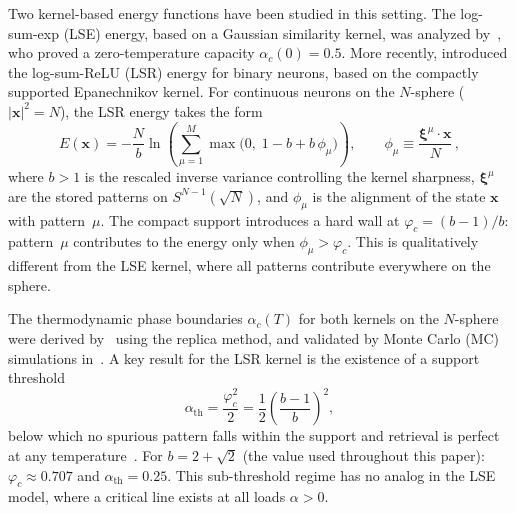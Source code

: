 \documentclass[11pt]{article}
\newcommand{\bxi}{\boldsymbol{\xi}}
\newcommand{\bx}{\mathbf{x}}
\begin{document}
Two kernel-based energy functions have been studied in this setting.  The log-sum-exp (LSE) energy, based on a Gaussian similarity kernel, was analyzed by~\citet{ramsauer2021hopfield}, who proved a zero-temperature capacity $\alpha_c(0) = 0.5$.  More recently, \citet{hoover2025dense} introduced the log-sum-ReLU (LSR) energy for binary neurons, based on the compactly supported Epanechnikov kernel.  For continuous neurons on the $N$-sphere ($|\bx|^2 = N$), the LSR energy takes the form
\begin{equation}
E(\bx) = -\frac{N}{b}\ln\left(\sum_{\mu=1}^{M}\max\!\Big(0,\;1 - b + b\,\phi_\mu\Big)\right),
\qquad \phi_\mu \equiv \frac{\bxi^\mu \cdot \bx}{N}\,,
\label{eq:lsr}
\end{equation}
where $b > 1$ is the rescaled inverse variance controlling the kernel sharpness, $\bxi^\mu$ are the stored patterns on $S^{N-1}(\!\sqrt{N})$, and $\phi_\mu$ is the alignment of the state $\bx$ with pattern~$\mu$.  The compact support introduces a hard wall at $\varphi_c = (b-1)/b$: pattern~$\mu$ contributes to the energy only when $\phi_\mu > \varphi_c$.  This is qualitatively different from the LSE kernel, where all patterns contribute everywhere on the sphere.

The thermodynamic phase boundaries $\alpha_c(T)$ for both kernels on the $N$-sphere were derived by~\citet{icml2026theory} using the replica method, and validated by Monte Carlo (MC) simulations in~\citet{iclr2026mc}.  A key result for the LSR kernel is the existence of a support threshold
\begin{equation}
\alpha_{\mathrm{th}} = \frac{\varphi_c^2}{2} = \frac{1}{2}\!\left(\frac{b-1}{b}\right)^{\!2},
\label{eq:alpha_th}
\end{equation}
below which no spurious pattern falls within the support and retrieval is perfect at any temperature~\citep{icml2026theory}.  For $b = 2+\sqrt{2}$ (the value used throughout this paper): $\varphi_c \approx 0.707$ and $\alpha_{\mathrm{th}} = 0.25$.  This sub-threshold regime has no analog in the LSE model, where a critical line exists at all loads $\alpha > 0$.
\end{document}
